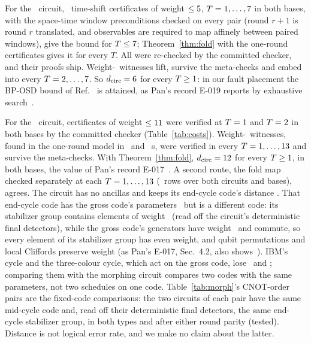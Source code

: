 \documentclass[aps,pra,twocolumn,superscriptaddress,nofootinbib,longbibliography,floatfix]{revtex4-2}
\newcommand{\dc}{d_{\mathrm{circ}}}
\begin{document}
For the \SmallCode\ circuit, \MorphSmallCerts\ time-shift certificates of weight $\le5$, $T=1,\dots,7$ in both bases, with the space-time window preconditions checked on every pair (round $r+1$ is round $r$ translated, and observables are required to map affinely between paired windows), give the bound for $T\le7$; Theorem~\ref{thm:fold} with the one-round certificates gives it for every $T$. All were re-checked by the committed checker, and their proofs ship. Weight-\MorphSmallD\ witnesses lift, survive the meta-checks and embed into every $T=2,\dots,7$. So $\dc=\MorphSmallD$ for every $T\ge1$: in our fault placement the BP-OSD bound of Ref.~\cite{shaw2024lowering} is attained, as Pan's record E-019 reports by exhaustive search~\cite{pan2026e019}.

For the \GrossCode\ circuit, certificates of weight $\le11$ were verified at $T=1$ and $T=2$ in both bases by the committed checker (Table~\ref{tab:costs}). Weight-\MorphBigD\ witnesses, found in the one-round model in \MorphWitSZ\ and \MorphWitSX~s, were verified in every $T=1,\dots,13$ and survive the meta-checks. With Theorem~\ref{thm:fold}, $\dc=\MorphBigD$ for every $T\ge1$, in both bases, the value of Pan's record E-017~\cite{pan2026e017}. A second route, the fold map checked separately at each $T=1,\dots,13$ (\FoldRows\ rows over both circuits and bases), agrees. The circuit has no ancillas and keeps its end-cycle code's distance \GrossD. That end-cycle code has the gross code's parameters \GrossCode\ but is a different code: its stabilizer group contains elements of weight \MorphEndStabW\ (read off the circuit's deterministic final detectors), while the gross code's generators have weight \GrossStabW\ and commute, so every element of its stabilizer group has even weight, and qubit permutations and local Cliffords preserve weight (as Pan's E-017, Sec.~4.2, also shows~\cite{pan2026e017}). IBM's cycle and the three-colour cycle, which act on the gross code, lose \IbmLoss\ and \TcLoss; comparing them with the morphing circuit compares two codes with the same parameters, not two schedules on one code. Table~\ref{tab:morph}'s CNOT-order pairs are the fixed-code comparisons: the two circuits of each pair have the same mid-cycle code and, read off their deterministic final detectors, the same end-cycle stabilizer group, in both types and after either round parity (tested). Distance is not logical error rate, and we make no claim about the latter.
\end{document}

